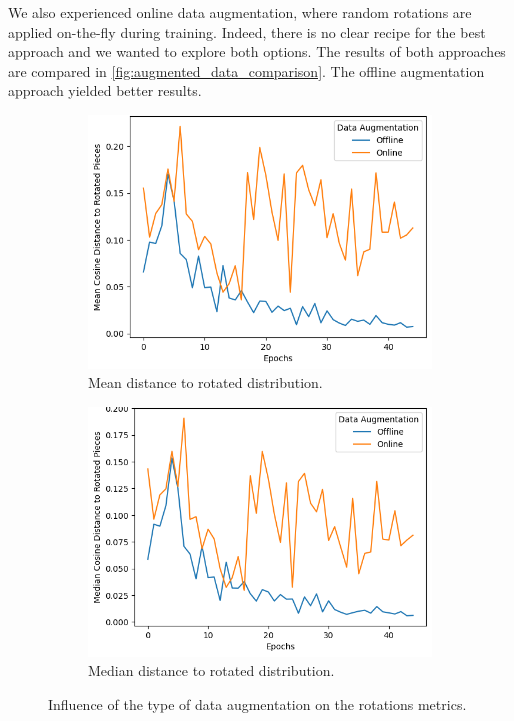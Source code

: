 We also experienced online data augmentation, where random rotations are applied on-the-fly during training. Indeed, there is no clear recipe for the best approach \cite{OfflineDataAugmentation} and we wanted to explore both options. The results of both approaches are compared in \autoref{fig:augmented_data_comparison}. The offline augmentation approach yielded better results.

\clearpage

\begin{figure}[h]
    \begin{subfigure}[h]{0.5\linewidth}
        \includegraphics[width=\columnwidth]{images/mean_rotated_data_augmentation_type.png}
        \caption{Mean distance to rotated distribution.}
        \label{fig:mean_rotated_data_augmentation_type}
    \end{subfigure}
    \hfill
    \begin{subfigure}[h]{0.5\linewidth}
        \includegraphics[width=\columnwidth]{images/median_rotated_data_augmentation_type.png}
        \caption{Median distance to rotated distribution.}
        \label{fig:median_rotated_data_augmentation_type}
    \end{subfigure}
    \caption{Influence of the type of data augmentation on the rotations metrics.}
    \label{fig:augmented_data_comparison}
\end{figure}

